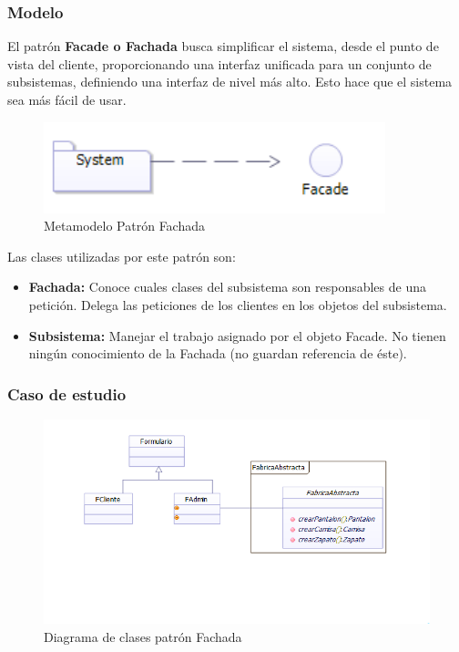 \subsubsection{Modelo}

El patrón \textbf{Facade o Fachada} busca simplificar el sistema, desde el punto de vista del cliente, proporcionando una interfaz unificada para un conjunto de subsistemas, definiendo una interfaz de nivel más alto. Esto hace que el sistema sea más fácil de usar.

\begin{figure}[th!]
	\centering
	\includegraphics[width=0.6\linewidth]{arquitectura/imagenes/modeloFachada}
	\caption{Metamodelo Patrón Fachada}
	\label{fig:metamodelo patron fachada}
\end{figure}


Las clases utilizadas por este patrón son:
\begin{itemize}
	\item \textbf{Fachada: }Conoce cuales clases del subsistema son responsables de una petición. Delega las peticiones de los clientes en los objetos del subsistema.
	\item \textbf{Subsistema: }Manejar el trabajo asignado por el objeto Facade. No tienen ningún conocimiento de la Fachada (no guardan referencia de éste).
\end{itemize}


\subsubsection{Caso de estudio}
\begin{figure}[h!]
	\centering
	\includegraphics[width=0.8\linewidth]{arquitectura/imagenes/DiagramaFachada}
	\caption{Diagrama de clases patrón Fachada}
\end{figure}

